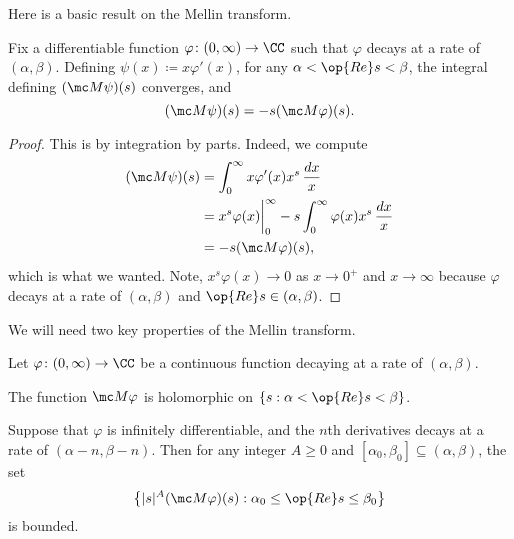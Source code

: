 \documentclass[../notes.tex]{subfiles}
\begin{document}
Here is a basic result on the Mellin transform.
\begin{lemma} \label{lem:deriv-mellin-transform}
	Fix a differentiable function $\varphi\colon(0,\infty)\to\CC$ such that $\varphi$ decays at a rate of $(\alpha,\beta)$. Defining $\psi(x)\coloneqq x\varphi'(x)$, for any $\alpha<\op{Re}s<\beta$, the integral defining $(\mc M\psi)(s)$ converges, and
	\[(\mc M\psi)(s)=-s(\mc M\varphi)(s).\]
\end{lemma}
\begin{proof}
	This is by integration by parts. Indeed, we compute
	\begin{align*}
		(\mc M\psi)(s) &= \int_0^\infty x\varphi'(x)x^s\,\frac{dx}x \\
		&= x^s\varphi(x)\bigg|_0^\infty-s\int_0^\infty\varphi(x)x^s\,\frac{dx}x \\
		&= -s(\mc M\varphi)(s),
	\end{align*}
	which is what we wanted. Note, $x^s\varphi(x)\to0$ as $x\to0^+$ and $x\to\infty$ because $\varphi$ decays at a rate of $(\alpha,\beta)$ and $\op{Re}s\in(\alpha,\beta)$.
\end{proof}
We will need two key properties of the Mellin transform.
\begin{proposition} \label{prop:bound-mellin-transform}
	Let $\varphi\colon(0,\infty)\to\CC$ be a continuous function decaying at a rate of $(\alpha,\beta)$. 
	\begin{listalph}
		\item The function $\mc M\varphi$ is holomorphic on $\{s:\alpha<\op{Re}s<\beta\}$.
		\item Suppose that $\varphi$ is infinitely differentiable, and the $n$th derivatives decays at a rate of $(\alpha-n,\beta-n)$. Then for any integer $A\ge0$ and $[\alpha_0,\beta_0]\subseteq(\alpha,\beta)$, the set
		\[\left\{|s|^A(\mc M\varphi)(s):\alpha_0\le\op{Re}s\le\beta_0\right\}\]
		is bounded.
	\end{listalph}
\end{proposition}
\end{document}
